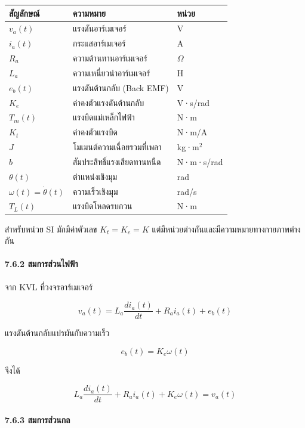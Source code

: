 \begin{table}[htbp]
    \centering
    \begin{tabular}{l l l}
        \hline
        \textbf{สัญลักษณ์} & \textbf{ความหมาย} & \textbf{หน่วย} \\
        \hline
        $v_a(t)$ & แรงดันอาร์เมเจอร์ & V \\
        $i_a(t)$ & กระแสอาร์เมเจอร์ & A \\
        $R_a$ & ความต้านทานอาร์เมเจอร์ & $\Omega$ \\
        $L_a$ & ความเหนี่ยวนำอาร์เมเจอร์ & H \\
        $e_b(t)$ & แรงดันต้านกลับ (Back EMF) & V \\
        $K_e$ & ค่าคงตัวแรงดันต้านกลับ & V·s/rad \\
        $T_m(t)$ & แรงบิดแม่เหล็กไฟฟ้า & N·m \\
        $K_t$ & ค่าคงตัวแรงบิด & N·m/A \\
        $J$ & โมเมนต์ความเฉื่อยรวมที่เพลา & kg·m$^2$ \\
        $b$ & สัมประสิทธิ์แรงเสียดทานหนืด & N·m·s/rad \\
        $\theta(t)$ & ตำแหน่งเชิงมุม & rad \\
        $\omega(t)=\dot{\theta}(t)$ & ความเร็วเชิงมุม & rad/s \\
        $T_L(t)$ & แรงบิดโหลดรบกวน & N·m \\
        \hline
    \end{tabular}
\end{table}

สำหรับหน่วย SI มักมีค่าตัวเลข $K_t=K_e=K$ แต่มีหน่วยต่างกันและมีความหมายทางกายภาพต่างกัน

\paragraph{7.6.2 สมการส่วนไฟฟ้า}

จาก KVL ที่วงจรอาร์เมเจอร์

\[
v_a(t)=L_a\frac{di_a(t)}{dt}+R_ai_a(t)+e_b(t)
\]

แรงดันต้านกลับแปรผันกับความเร็ว

\[
e_b(t)=K_e\omega(t)
\]

จึงได้

\[
L_a\frac{di_a(t)}{dt}+R_ai_a(t)+K_e\omega(t)=v_a(t)
\]

\paragraph{7.6.3 สมการส่วนกล}

